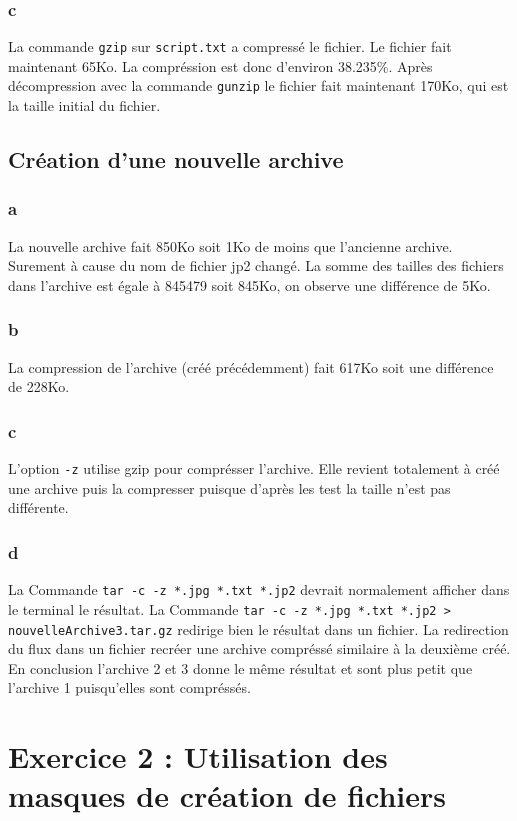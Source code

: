             \subsubsection{c}
                La commande \texttt{gzip} sur \texttt{script.txt} a compressé le fichier.
                Le fichier fait maintenant  65Ko.
                La compréssion est donc d'environ 38.235\%.
                Après décompression avec la commande \texttt{gunzip} le fichier fait maintenant 170Ko, qui est la taille initial du fichier.
        \subsection{Création d'une nouvelle archive}
            \subsubsection{a}
                La nouvelle archive fait 850Ko soit 1Ko de moins que l'ancienne archive. Surement à cause du nom de fichier jp2 changé.
                La somme des tailles des fichiers dans l'archive est égale à 845479 soit 845Ko, on observe une différence de 5Ko.
            \subsubsection{b}
                La compression de l'archive (créé précédemment) fait 617Ko soit une différence de 228Ko.
            \subsubsection{c}
                L'option \texttt{-z} utilise gzip pour comprésser l'archive.
                Elle revient totalement à créé une archive puis la compresser puisque d'après les test la taille n'est pas différente.
            \subsubsection{d}
                La Commande \texttt{tar -c -z *.jpg *.txt *.jp2} devrait normalement afficher dans le terminal le résultat.
                La Commande \texttt{tar -c -z *.jpg *.txt *.jp2 > nouvelleArchive3.tar.gz} redirige bien le résultat dans un fichier.
                La redirection du flux dans un fichier recréer une archive compréssé similaire à la deuxième créé.
                En conclusion l'archive 2 et 3 donne le même résultat et sont plus petit que l'archive 1 puisqu'elles sont compréssés.
    \section{Exercice 2 : Utilisation des masques de création de fichiers}
